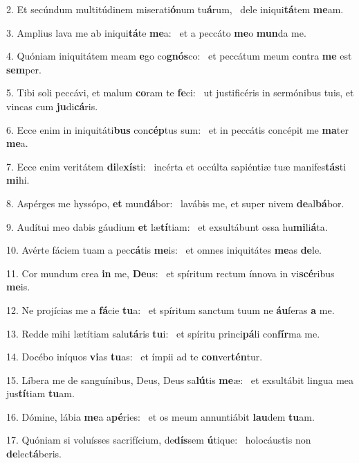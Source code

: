 2. Et secúndum multitúdinem miserati\textbf{ó}num tu\textbf{á}rum, \ast\  dele iniqui\textbf{tá}tem \textbf{me}am.\

3. Amplius lava me ab iniqui\textbf{tá}te \textbf{me}a: \ast\  et a peccáto \textbf{me}o \textbf{mun}da me.\

4. Quóniam iniquitátem meam \textbf{e}go co\textbf{gnós}co: \ast\  et peccátum meum contra \textbf{me} est \textbf{sem}per.\

5. Tibi soli peccávi, et malum \textbf{co}ram te \textbf{fe}ci: \ast\  ut justificéris in sermónibus tuis, et vincas cum \textbf{ju}di\textbf{cá}ris.\

6. Ecce enim in iniquitáti\textbf{bus} con\textbf{cép}tus sum: \ast\  et in peccátis concépit me \textbf{ma}ter \textbf{me}a.\

7. Ecce enim veritátem \textbf{di}le\textbf{xís}ti: \ast\  incérta et occúlta sapiéntiæ tuæ manifes\textbf{tás}ti \textbf{mi}hi.\

8. Aspérges me hyssópo, \textbf{et} mun\textbf{dá}bor: \ast\  lavábis me, et super nivem \textbf{de}al\textbf{bá}bor.\

9. Audítui meo dabis gáudium \textbf{et} læ\textbf{tí}tiam: \ast\  et exsultábunt ossa hu\textbf{mi}li\textbf{á}ta.\

10. Avérte fáciem tuam a pec\textbf{cá}tis \textbf{me}is: \ast\  et omnes iniquitátes \textbf{me}as \textbf{de}le.\

11. Cor mundum crea \textbf{in} me, \textbf{De}us: \ast\  et spíritum rectum ínnova in vi\textbf{scé}ribus \textbf{me}is.\

12. Ne projícias me a \textbf{fá}cie \textbf{tu}a: \ast\  et spíritum sanctum tuum ne \textbf{áu}feras \textbf{a} me.\

13. Redde mihi lætítiam salu\textbf{tá}ris \textbf{tu}i: \ast\  et spíritu princi\textbf{pá}li con\textbf{fír}ma me.\

14. Docébo iníquos \textbf{vi}as \textbf{tu}as: \ast\  et ímpii ad te \textbf{con}ver\textbf{tén}tur.\

15. Líbera me de sanguínibus, Deus, Deus sa\textbf{lú}tis \textbf{me}æ: \ast\  et exsultábit lingua mea jus\textbf{tí}tiam \textbf{tu}am.\

16. Dómine, lábia \textbf{me}a a\textbf{pé}ries: \ast\  et os meum annuntiábit \textbf{lau}dem \textbf{tu}am.\

17. Quóniam si voluísses sacrifícium, de\textbf{dís}sem \textbf{ú}tique: \ast\  holocáustis non \textbf{de}lec\textbf{tá}beris.\


